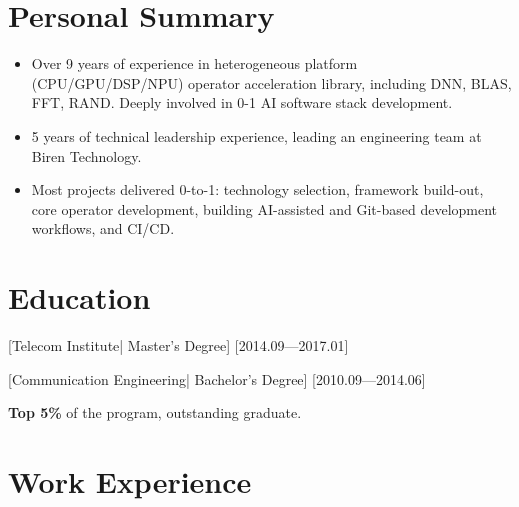 \documentclass{resume}
\begin{document}


\ResumeTitle


\section{Personal Summary}

\begin{itemize}
  \item Over 9 years of experience in heterogeneous platform (CPU/GPU/DSP/NPU) operator acceleration library, including DNN, BLAS, FFT, RAND. Deeply involved in 0-1 AI software stack development.
  \item 5 years of technical leadership experience, leading an engineering team at Biren Technology.
  \item Most projects delivered 0-to-1: technology selection, framework build-out, core operator development, building AI-assisted and Git-based development workflows, and CI/CD.
\end{itemize}

\section{Education}
[\textnormal{Telecom Institute|} Master's Degree]
[2014.09—2017.01]

\nocite{*} %
\printbibliography[heading={none}]



[\textnormal{Communication Engineering|} Bachelor's Degree]
[2010.09—2014.06]

\textbf{Top 5\%} of the program, outstanding graduate.

\section{Work Experience}
\end{document}
